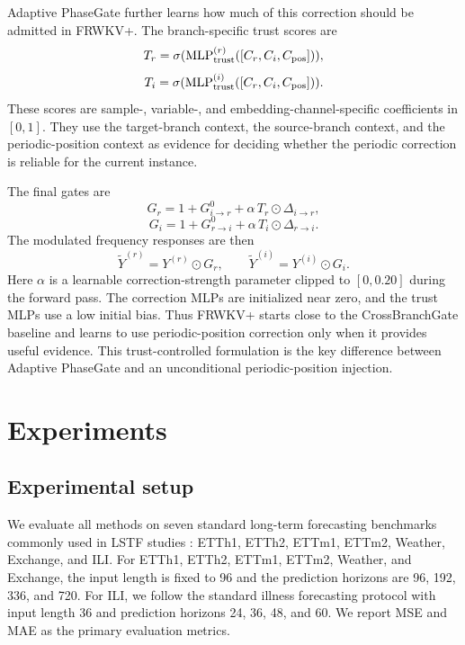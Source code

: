 \documentclass[a4paper,fleqn]{cas-sc}
\begin{document}
Adaptive PhaseGate further learns how much of this correction should be admitted in FRWKV+. The branch-specific trust scores are
\begin{equation}
T_r = \sigma(\operatorname{MLP}^{(r)}_{\text{trust}}([C_r, C_i, C_{\rm pos}])),
\end{equation}
\begin{equation}
T_i = \sigma(\operatorname{MLP}^{(i)}_{\text{trust}}([C_r, C_i, C_{\rm pos}])).
\end{equation}
These scores are sample-, variable-, and embedding-channel-specific coefficients in $[0,1]$. They use the target-branch context, the source-branch context, and the periodic-position context as evidence for deciding whether the periodic correction is reliable for the current instance.

The final gates are
\begin{equation}
G_r = 1 + G_{i\to r}^0 + \alpha \, T_r \odot \Delta_{i\to r},
\end{equation}
\begin{equation}
G_i = 1 + G_{r\to i}^0 + \alpha \, T_i \odot \Delta_{r\to i}.
\end{equation}
The modulated frequency responses are then
\begin{equation}
\tilde{Y}^{(r)} = Y^{(r)} \odot G_r, \qquad
\tilde{Y}^{(i)} = Y^{(i)} \odot G_i.
\end{equation}
Here $\alpha$ is a learnable correction-strength parameter clipped to $[0,0.20]$ during the forward pass. The correction MLPs are initialized near zero, and the trust MLPs use a low initial bias. Thus FRWKV+ starts close to the CrossBranchGate baseline and learns to use periodic-position correction only when it provides useful evidence. This trust-controlled formulation is the key difference between Adaptive PhaseGate and an unconditional periodic-position injection.

\clearpage

\section{Experiments}
\subsection{Experimental setup}
We evaluate all methods on seven standard long-term forecasting benchmarks commonly used in LSTF studies \cite{zhou2021informer,wu2021autoformer,zhou2022fedformer}: ETTh1, ETTh2, ETTm1, ETTm2, Weather, Exchange, and ILI. For ETTh1, ETTh2, ETTm1, ETTm2, Weather, and Exchange, the input length is fixed to 96 and the prediction horizons are 96, 192, 336, and 720. For ILI, we follow the standard illness forecasting protocol with input length 36 and prediction horizons 24, 36, 48, and 60. We report MSE and MAE as the primary evaluation metrics.
\end{document}
